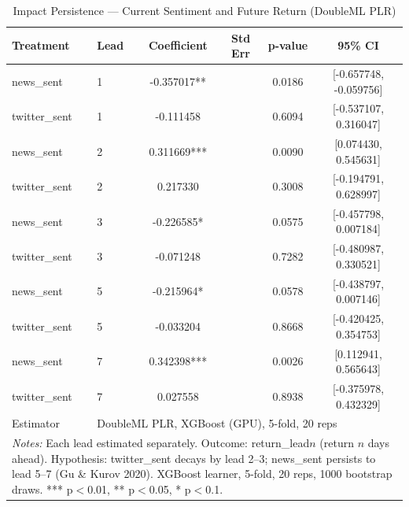 \begin{table}[htbp]
\centering
\caption{Impact Persistence --- Current Sentiment and Future Return (DoubleML PLR)}
\begin{tabular}{llcccc}
\hline\hline
Treatment & Lead & Coefficient & Std Err & p-value & 95\% CI \\
\hline
news\_sent & 1 & -0.357017** &  & 0.0186 & [-0.657748, -0.059756] \\
twitter\_sent & 1 & -0.111458 &  & 0.6094 & [-0.537107, 0.316047] \\
news\_sent & 2 & 0.311669*** &  & 0.0090 & [0.074430, 0.545631] \\
twitter\_sent & 2 & 0.217330 &  & 0.3008 & [-0.194791, 0.628997] \\
news\_sent & 3 & -0.226585* &  & 0.0575 & [-0.457798, 0.007184] \\
twitter\_sent & 3 & -0.071248 &  & 0.7282 & [-0.480987, 0.330521] \\
news\_sent & 5 & -0.215964* &  & 0.0578 & [-0.438797, 0.007146] \\
twitter\_sent & 5 & -0.033204 &  & 0.8668 & [-0.420425, 0.354753] \\
news\_sent & 7 & 0.342398*** &  & 0.0026 & [0.112941, 0.565643] \\
twitter\_sent & 7 & 0.027558 &  & 0.8938 & [-0.375978, 0.432329] \\
\hline
Estimator & \multicolumn{5}{l}{DoubleML PLR, XGBoost (GPU), 5-fold, 20 reps} \\
\hline\hline
\multicolumn{6}{l}{\footnotesize \textit{Notes:} Each lead estimated separately. Outcome: return\_lead$n$ (return $n$ days ahead). Hypothesis: twitter\_sent decays by lead 2--3; news\_sent persists to lead 5--7 (Gu \& Kurov 2020). XGBoost learner, 5-fold, 20 reps, 1000 bootstrap draws. *** p$<$0.01, ** p$<$0.05, * p$<$0.1.} \\
\end{tabular}
\end{table}